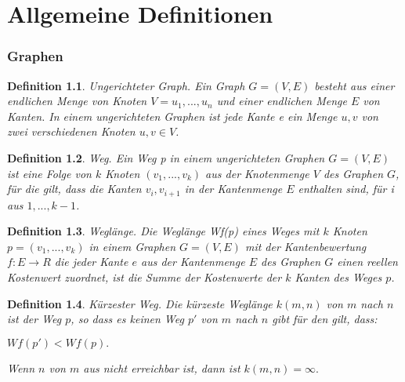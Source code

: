 
\chapter{Allgemeine Definitionen}

\subsection{Graphen}
\newtheorem*{graphen_definition}{Definition}

\begin{graphen_definition}
Ungerichteter Graph. Ein Graph $G=(V,E)$ besteht aus einer endlichen Menge von Knoten $V = {u_{1}, ..., u_{n}}$ und einer endlichen Menge $E$ von Kanten. In einem ungerichteten Graphen ist jede Kante e ein Menge ${u,v}$ von zwei verschiedenen Knoten $u,v\in V$. 
\end{graphen_definition}

\begin{graphen_definition}
Weg. Ein Weg p in einem ungerichteten Graphen $G=(V,E)$ ist eine Folge von $k$ Knoten $(v_{1}, ..., v_{k})$ aus der Knotenmenge $V$ des Graphen $G$, f\"ur die gilt, dass die Kanten ${v_{i}, v_{i+1}}$ in der Kantenmenge $E$ enthalten sind, f\"ur i aus ${1, ..., k-1}$. 
\end{graphen_definition}

\begin{graphen_definition}
Wegl\"ange. Die Wegl\"ange Wf(p) eines Weges mit $k$ Knoten $p=(v_{1}, ..., v_{k})$ in einem Graphen $G=(V,E)$ mit der Kantenbewertung $f:E\rightarrow R$ die jeder Kante $e$ aus der Kantenmenge $E$ des Graphen $G$ einen reellen Kostenwert zuordnet, ist die Summe der Kostenwerte der $k$ Kanten des Weges $p$. 
\end{graphen_definition}

\begin{graphen_definition}
K\"urzester Weg. Die k\"urzeste Wegl\"ange $k(m,n)$ von $m$ nach $n$ ist der Weg $p$, so dass  es keinen Weg $p'$ von $m$ nach $n$ gibt f\"ur den gilt, dass:
\begin{center}
$Wf(p') < Wf(p).$
\end{center}
Wenn $n$ von $m$ aus nicht erreichbar ist, dann ist $k(m, n)=\infty.$ 
\end{graphen_definition}